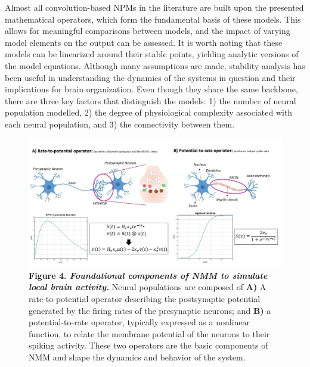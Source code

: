 \documentclass[12pt,twoside]{article}
\begin{document}
Almost all convolution-based NPMs in the literature are built upon the presented mathematical operators, which form the fundamental basis of these models. This allows for meaningful comparisons between models, and the impact of varying model elements on the output can be assessed. It is worth noting that these models can be linearized around their stable points, yielding analytic versions of the model equations. Although many assumptions are made, stability analysis has been useful in understanding the dynamics of the systems in question and their implications for brain organization. 
Even though they share the same backbone, there are three key factors that distinguish the models: 1) the number of neural population modelled, 2) the degree of physiological complexity associated with each neural population, and 3) the connectivity between them. %
\begin{figure}[H] 
    \hspace{-0.3cm}
    \includegraphics[width=\linewidth]{Images/Common_elem_1.jpg}
    \caption*{\textbf{Figure 4. \textit{Foundational components of NMM to simulate local brain activity.}} Neural populations are composed of \textbf{A)} A rate-to-potential operator describing the postsynaptic potential generated by the firing rates of the presynaptic neurons; and \textbf{B)} a potential-to-rate operator, typically expressed as a nonlinear function, to relate the membrane potential of the neurons to their spiking activity. These two operators are the basic components of NMM and shape the dynamics and behavior of the system.}
    \label{fig:Common_NMM}
\end{figure}
\end{document}
